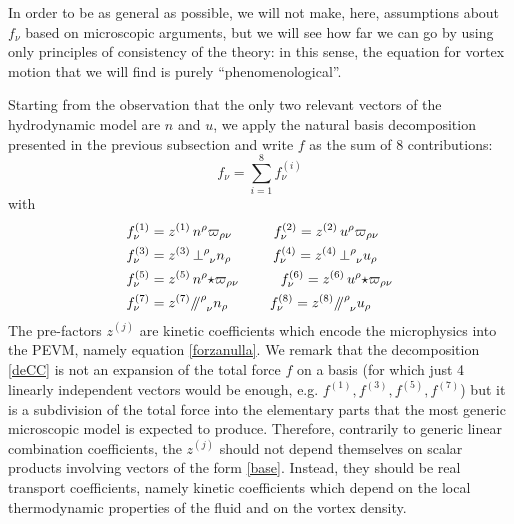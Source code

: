 \documentclass[preprints,article,accept,moreauthors,pdftex]{mdpi}
\newcommand{\spc}{\quad \quad \quad}
\newcommand{\paral}{\mathbin{\!/\mkern-5mu/\!}}
\begin{document}
In order to be as general as possible, we will not make, here, assumptions about $f_\nu$ based on microscopic arguments, but we will see how far we can go by using only principles of consistency of the theory: in this sense, the equation for vortex motion that we will find is purely ``phenomenological''.

Starting from the observation that the only two relevant vectors of the hydrodynamic model are $n$ and $u$, we apply the natural basis decomposition presented in the previous subsection and write $f$ as the sum of 8 contributions:
\begin{equation}\label{deCC}
f_\nu = \sum_{i=1}^8 f^{(i)}_\nu 
\end{equation}
with
\begin{equation}
\begin{split}
& f^{(1)}_\nu=z^{(1)} \, n^\rho \varpi_{ \rho \nu}  \spc  f^{(2)}_\nu =z^{(2)}  \, u^\rho \varpi_{ \rho \nu}   \\
& f^{(3)}_\nu=z^{(3)} \, {\perp}\indices{^\rho _\nu} n_\rho   \spc  f^{(4)}_\nu =z^{(4)} \,  {\perp}\indices{^\rho _\nu} u_\rho  \\
& f^{(5)}_\nu=z^{(5)}  \, n^\rho {\star}\varpi_{ \rho \nu}   \spc  f^{(6)}_\nu =z^{(6)} \,  u^\rho {\star}\varpi_{ \rho \nu} \\
& f^{(7)}_\nu= z^{(7)}  \, {\paral \,}\indices{^\rho _\nu} n_\rho  \spc  f^{(8)}_\nu =z^{(8)}  \,  {\paral \,}\indices{^\rho _\nu} u_\rho  \\
\end{split}
\label{stocazzone}
\end{equation}
The pre-factors $z^{(j)}$ are kinetic coefficients which encode the microphysics into the PEVM, namely equation \eqref{forzanulla}. 
We remark that the decomposition \eqref{deCC} is not an expansion of the total force $f$ on a basis (for which just 4 linearly independent vectors would be enough, e.g. $f^{(1)},f^{(3)},f^{(5)},f^{(7)}$) but it is a subdivision of the total force into the elementary parts that the most generic microscopic model is expected to produce. 
Therefore, contrarily to generic linear combination coefficients, the $z^{(j)}$ should not depend themselves on scalar products involving vectors of the form \eqref{base}. Instead, they should be real transport coefficients, namely kinetic coefficients which depend on the local thermodynamic properties of the fluid and on the vortex density. 
\end{document}
